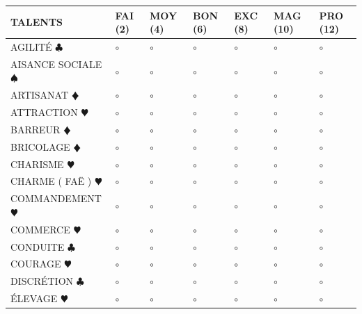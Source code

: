 \documentclass[a5paper]{letter}
\begin{document}
{{%

\begin{tabular}[c]{|p{}|p{}|p{}|p{}|p{}|p{}|p{}|}
	\hline
	\textbf{TALENTS}									&	FAI (2)	&	MOY (4)	&	BON (6)	&	EXC (8)	&	MAG (10)	&	PRO (12)	\\ \hline
	AGILITÉ { $\clubsuit$ }								&	$\circ$	&	$\circ$	&	$\circ$	&	$\circ$	&	$\circ$		&	$\circ$		\\ \hline
	AISANCE SOCIALE { $\spadesuit$ }					&	$\circ$	&	$\circ$	&	$\circ$	&	$\circ$	&	$\circ$		&	$\circ$		\\ \hline
	ARTISANAT {\color{red} $\vardiamond$ }				&	$\circ$	&	$\circ$	&	$\circ$	&	$\circ$	&	$\circ$		&	$\circ$		\\ \hline	
	ATTRACTION {\color{red} $\varheart$ }				&	$\circ$	&	$\circ$	&	$\circ$	&	$\circ$	&	$\circ$		&	$\circ$		\\ \hline
	BARREUR {\color{red} $\vardiamond$ }				&	$\circ$	&	$\circ$	&	$\circ$	&	$\circ$	&	$\circ$		&	$\circ$		\\ \hline
	BRICOLAGE {\color{red} $\vardiamond$ }				&	$\circ$	&	$\circ$	&	$\circ$	&	$\circ$	&	$\circ$		&	$\circ$		\\ \hline
	CHARISME {\color{red} $\varheart$ }					&	$\circ$	&	$\circ$	&	$\circ$	&	$\circ$	&	$\circ$		&	$\circ$		\\ \hline
	CHARME ( FAË ) {\color{red} $\varheart$ }			&	$\circ$	&	$\circ$	&	$\circ$	&	$\circ$	&	$\circ$		&	$\circ$		\\ \hline
	COMMANDEMENT {\color{red} $\varheart$ }				&	$\circ$	&	$\circ$	&	$\circ$	&	$\circ$	&	$\circ$		&	$\circ$		\\ \hline
	COMMERCE {\color{red} $\varheart$ }					&	$\circ$	&	$\circ$	&	$\circ$	&	$\circ$	&	$\circ$		&	$\circ$		\\ \hline
	CONDUITE { $\clubsuit$ }							&	$\circ$	&	$\circ$	&	$\circ$	&	$\circ$	&	$\circ$		&	$\circ$		\\ \hline
	COURAGE {\color{red} $\varheart$ }					&	$\circ$	&	$\circ$	&	$\circ$	&	$\circ$	&	$\circ$		&	$\circ$		\\ \hline
	DISCRÉTION { $\clubsuit$ }							&	$\circ$	&	$\circ$	&	$\circ$	&	$\circ$	&	$\circ$		&	$\circ$		\\ \hline
	ÉLEVAGE {\color{red} $\varheart$ }					&	$\circ$	&	$\circ$	&	$\circ$	&	$\circ$	&	$\circ$		&	$\circ$		\\ \hline

\end{tabular}}}
\end{document}
